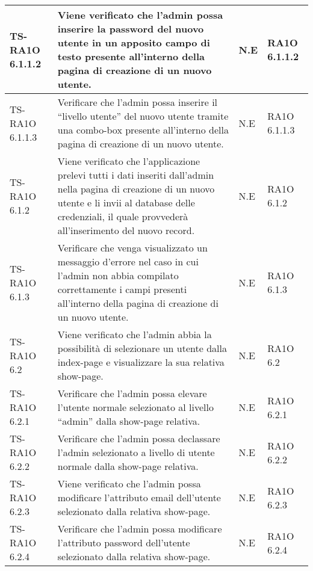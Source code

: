 \begin{center}
\begin{longtable}{| p{3cm} | p{6cm} | p{1.5cm} | p{2cm} | }
				TS-RA1O 6.1.1.2 & 
				Viene verificato che l'admin possa inserire la password del nuovo utente in un apposito campo di testo presente all'interno della pagina di creazione di un nuovo utente. & N.E & RA1O 6.1.1.2 \newline  \\ \hline 
				TS-RA1O 6.1.1.3 & 
				Verificare che l'admin possa inserire il ``livello utente'' del nuovo utente tramite una combo-box presente all'interno della pagina di creazione di un nuovo utente. & N.E & RA1O 6.1.1.3 \newline  \\ \hline 
				TS-RA1O 6.1.2 & 
				Viene verificato che l'applicazione prelevi tutti i dati inseriti dall'admin nella pagina di creazione di un nuovo utente e li invii al database delle credenziali, il quale provvederà all'inserimento del nuovo record. & N.E & RA1O 6.1.2 \newline  \\ \hline 
				TS-RA1O 6.1.3 & 
				Verificare che venga visualizzato un messaggio d'errore nel caso in cui l'admin non abbia compilato correttamente i campi presenti all'interno della pagina di creazione di un nuovo utente. & N.E & RA1O 6.1.3 \newline  \\ \hline 
				TS-RA1O 6.2 & 
				Viene verificato che l'admin abbia la possibilità di selezionare un utente dalla index-page e visualizzare la sua relativa show-page. & N.E & RA1O 6.2 \newline  \\ \hline 
				TS-RA1O 6.2.1 & 
				Verificare che l'admin possa elevare l'utente normale selezionato al livello ``admin'' dalla show-page relativa. & N.E & RA1O 6.2.1 \newline  \\ \hline 
				TS-RA1O 6.2.2 & 
				Verificare che l'admin possa declassare l'admin selezionato a livello di utente normale dalla show-page relativa. & N.E & RA1O 6.2.2 \newline  \\ \hline 
				TS-RA1O 6.2.3 & 
				Viene verificato che l'admin possa modificare l'attributo email dell'utente selezionato dalla relativa show-page. & N.E & RA1O 6.2.3 \newline  \\ \hline 
				TS-RA1O 6.2.4 & 
				Verificare che l'admin possa modificare l'attributo password dell'utente selezionato dalla relativa show-page. & N.E & RA1O 6.2.4 \newline  \\ \hline 

\end{longtable}
\end{center}
